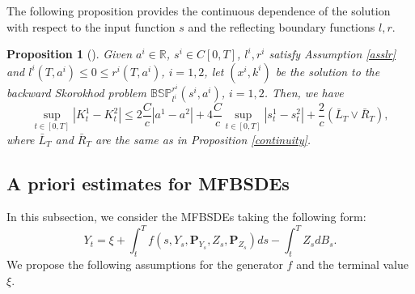 \documentclass[10pt]{article}%
\numberwithin{equation}{section}
\newtheorem{proposition}[theorem]{Proposition}
\begin{document}
The following proposition provides the continuous dependence of the solution with respect to the input function $s$ and the reflecting boundary functions $l,r$.

\begin{proposition}[\cite{L}]\label{continuous}
Given $a^i\in\mathbb{R}$, $s^i\in C[0,T]$, $l^i,r^i$ satisfy Assumption \ref{asslr} and $l^i(T,a^i)\leq 0\leq r^i(T,a^i)$, $i=1,2$, 
 let $(x^i,k^i)$ be the solution to the backward Skorokhod problem $\mathbb{BSP}_{l^i}^{r^i}(s^i,a^i)$, $i=1,2$. Then, we have
\begin{equation}\label{diffK}
\sup_{t\in[0,T]}\left|K^1_t-K^2_t\right|
\leq  2\frac{C}{c}\left|a^1-a^2\right|+4\frac{C}{c}\sup_{t\in[0,T]}\left|s^1_t-s^2_t\right|+\frac{2}{c}(\bar{L}_T\vee\bar{R}_T),
\end{equation}
where $\bar{L}_T$ and $\bar{R}_T$ are the same as in Proposition \ref{continuity}.
\end{proposition}
\subsection{A priori estimates for MFBSDEs}

In this subsection, we consider the MFBSDEs taking the following form:
\begin{equation}\label{MFBSDE}
    Y_t=\xi+\int_{t}^{T}f(s,Y_s, \mathbf{P}_{Y_s},Z_s,\mathbf{P}_{Z_s})ds-\int_{t}^{T}Z_sdB_s.
\end{equation}
We propose the following assumptions for the generator $f$ and the terminal value $\xi$.
\end{document}
